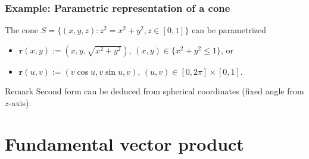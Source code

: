 \documentclass[aspectratio=169]{beamer}
\newcommand{\rr}{\mathbf{r}}
\newcommand{\cover}[1]{{#1}}
\begin{document}
\begin{frame}
    \frametitle{Example: Parametric representation of a cone}


    \begin{example}[cone]
        The cone \(S = \{(x,y,z): z^2 = x^2+y^2, z\in [0,1]\}\) can be parametrized
        \begin{itemize}
            \item \(\rr(x,y):=(x,y,\cover{\sqrt{x^2+y^2}})\), \((x,y)\in\{x^2+y^2 \leq 1\}\), or
            \item \(\rr(u,v):=(v \cos u, v \sin u, \cover{v})\), \((u,v)\in  [0,2\pi] \times [0,1]\).
        \end{itemize}
    \end{example}


    \begin{block}{Remark}
        Second form can be deduced from spherical coordinates (fixed angle from \(z\)-axis).
    \end{block}

\end{frame}

\section{Fundamental vector product}
\end{document}
